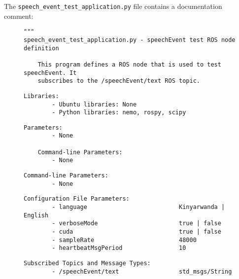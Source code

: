 \documentclass{CSSRforAfrica}
\newcommand{\blank}{~\\}
\newcommand{\checkboxChecked}{\fbox{\ding{51}}} %
\begin{document}

\noindent The {\small \verb+speech_event_test_application.py+} file contains a documentation comment:

\begin{description}

\item[\checkboxChecked] 
 {\small 
\begin{verbatim}
"""
speech_event_test_application.py - speechEvent test ROS node definition

    This program defines a ROS node that is used to test speechEvent. It
    subscribes to the /speechEvent/text ROS topic.

\end{verbatim}}

\item[\checkboxChecked] 
 {\small 
\begin{verbatim}
Libraries:
        - Ubuntu libraries: None
        - Python libraries: nemo, rospy, scipy
\end{verbatim}}

\item[\checkboxChecked] 
 {\small 
\begin{verbatim}
Parameters:
        - None
    
    Command-line Parameters:
        - None
\end{verbatim}}

\item[\checkboxChecked] 
 {\small 
\begin{verbatim}
Command-line Parameters:
        - None
\end{verbatim}}

\item[\checkboxChecked] 
 {\small 
\begin{verbatim}
Configuration File Parameters:
        - language                          Kinyarwanda | English
        - verboseMode                       true | false
        - cuda                              true | false
        - sampleRate                        48000
        - heartbeatMsgPeriod                10
\end{verbatim}}

\item[\checkboxChecked] 
 {\small 
\begin{verbatim}
Subscribed Topics and Message Types:
        - /speechEvent/text                 std_msgs/String
\end{verbatim}}


\end{description}
\end{document}
